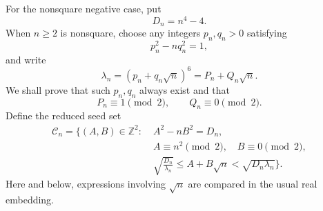\documentclass[a4paper,11pt]{amsart}
\theoremstyle{definition}
\theoremstyle{remark}
\newcommand{\Z}{\mathbb Z}
\begin{document}
For the nonsquare negative case, put
\begin{equation}\label{eq:Dn}
D_n=n^4-4.
\end{equation}
When $n\ge2$ is nonsquare, choose any integers $p_n,q_n>0$ satisfying
\begin{equation}\label{eq:pell-unit}
p_n^2-nq_n^2=1,
\end{equation}
and write
\begin{equation}\label{eq:lambda-def}
\lambda_n=(p_n+q_n\sqrt n)^6=P_n+Q_n\sqrt n.
\end{equation}
We shall prove that such $p_n,q_n$ always exist and that
\begin{equation}\label{eq:PQ-parity}
P_n\equiv1\pmod2,
\qquad Q_n\equiv0\pmod2.
\end{equation}
Define the reduced seed set
\begin{equation}\label{eq:seed-set}
\begin{split}
\mathcal C_n=\biggl\{(A,B)\in\Z^2:\;&A^2-nB^2=D_n,\\
&A\equiv n^2\pmod2,\quad B\equiv0\pmod2,\\
&\sqrt{\frac{D_n}{\lambda_n}}
 \le A+B\sqrt n
 <\sqrt{D_n\lambda_n}\biggr\}.
\end{split}
\end{equation}
Here and below, expressions involving $\sqrt n$ are compared in the usual real embedding.
\end{document}
